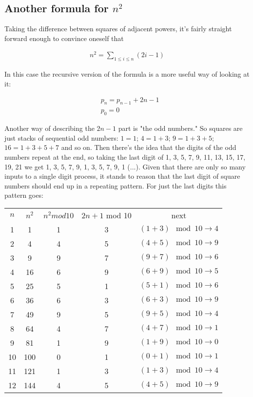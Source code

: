 \subsection{Another formula for $n^2$}

Taking the difference between squares of adjacent powers, it's fairly straight forward enough to convince
oneself that

\begin{align*}
     n^2 = \sum_{1 \leq i \leq n} (2i - 1)
\end{align*}

In this case the recursive version of the formula is a more useful way of looking at it:

\begin{align*}
     &p_n = p_{n - 1} + 2n - 1 \\
     &p_0 = 0
\end{align*}

Another way of describing the $2n - 1$ part is "the odd numbers."  So squares are just stacks of sequential odd numbers:
$1 = 1$; $4 = 1 + 3$; $9 = 1 + 3 + 5$; $16 = 1 + 3 + 5 + 7$ and so on.  Then there's the idea that the digits of the odd
numbers repeat at the end, so taking the last digit of 1, 3, 5, 7, 9, 11, 13, 15, 17, 19, 21 we get 1, 3, 5, 7, 9,
1, 3, 5, 7, 9, 1 (...).  Given that there are only so many inputs to a single digit process, it stands to reason that the
last digit of square numbers should end up in a repeating pattern.  For just the last digits this pattern goes:

\begin{center}
\begin{tabular}{ c c c c c }
$n$ & $n^2$ & $n^2 mod 10$ & $2n + 1$ mod 10 & next \\ 
1 & 1 & 1 & 3 & $(1 + 3) \mod 10 \rightarrow 4$ \\  
2 & 4 & 4 & 5 & $(4 + 5) \mod 10 \rightarrow 9$ \\
3 & 9 & 9 & 7 & $(9 + 7) \mod 10 \rightarrow 6$ \\
4 & 16 & 6 & 9 & $(6 + 9) \mod 10 \rightarrow 5$ \\
5 & 25 & 5 & 1 & $(5 + 1) \mod 10 \rightarrow 6$ \\
6 & 36 & 6 & 3 & $(6 + 3) \mod 10 \rightarrow 9$ \\
7 & 49 & 9 & 5 & $(9 + 5) \mod 10 \rightarrow 4$ \\
8 & 64 & 4 & 7 & $(4 + 7) \mod 10 \rightarrow 1$ \\
9 & 81 & 1 & 9 & $(1 + 9) \mod 10 \rightarrow 0$ \\
10 & 100 & 0 & 1 & $(0 + 1) \mod 10 \rightarrow 1$ \\
11 & 121 & 1 & 3 & $(1 + 3) \mod 10 \rightarrow 4$ \\
12 & 144 & 4 & 5 & $(4 + 5) \mod 10 \rightarrow 9$  
\end{tabular}
\end{center}

